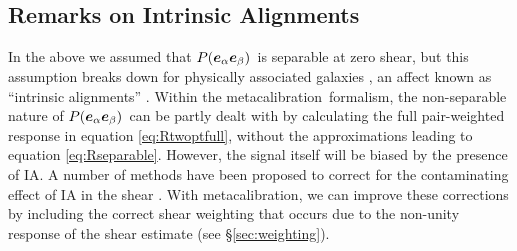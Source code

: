 \documentclass[iop]{emulateapj}
\newcommand{\vest}{\mbox{\boldmath $e$}}
\newcommand{\mcal}{metacalibration}
\newcommand{\probe}{\mbox{$P(\vest_\alpha \vest_\beta)$}}
\begin{document}
\subsection{Remarks on Intrinsic Alignments} \label{sec:IA}

In the above we assumed that \probe\ is separable at zero shear, but this
assumption breaks down for physically associated galaxies
\citep[e.g.][]{HirataIntrinsicAlign07}, an affect known as ``intrinsic
alignments'' \citep[IA; for a recent review, see][]{TroxelIAReview2015}.
Within the \mcal\ formalism, the non-separable nature of \probe\ can be partly
dealt with by calculating the full pair-weighted response in equation
\ref{eq:Rtwoptfull}, without the approximations leading to equation
\ref{eq:Rseparable}.  However, the signal itself will be biased by the presence
of IA.  A number of methods  have been proposed to correct for the
contaminating effect of IA in the shear \citep{TroxelIAReview2015}.  With
\mcal, we can improve these corrections by including the correct shear
weighting that occurs due to the non-unity response of the shear estimate (see
\S \ref{sec:weighting}).
\end{document}
